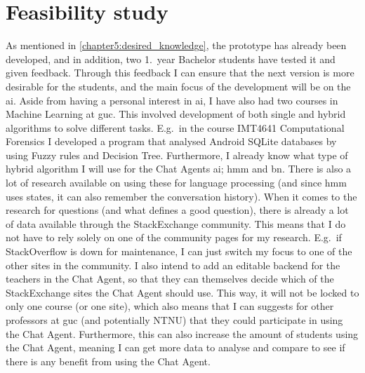 \chapter{Feasibility study}
\label{chapter6:feasibility_study}
As mentioned in \ref{chapter5:desired_knowledge}, the prototype has already been developed, and in addition, two 1.~year Bachelor students have tested it and given feedback. 
Through this feedback I can ensure that the next version is more desirable for the students, and the main focus of the development will be on the \gls{ai}. Aside from 
having a personal interest in \gls{ai}, I have also had two courses in Machine Learning at \gls{guc}. This involved development of both single and hybrid algorithms to 
solve different tasks. E.g.~in the course IMT4641 Computational Forensics I developed a program that analysed Android SQLite databases by using Fuzzy rules and Decision Tree.
Furthermore, I already know what type of hybrid algorithm I will use for the Chat Agents \gls{ai}; \gls{hmm} and \gls{bn}. There is also a lot of research available on 
using these for language processing (and since \gls{hmm} uses states, it can also remember the conversation history).
\vspace{0.5em}\newline
When it comes to the research for questions (and what defines a good question), there is already a lot of data available through the StackExchange community. This means that 
I do not have to rely solely on one of the community pages for my research. E.g.~if StackOverflow is down for maintenance, I can just switch my focus to one of the other 
sites in the community. I also intend to add an editable backend for the teachers in the Chat Agent, so that they can themselves decide which of the StackExchange sites the 
Chat Agent should use. This way, it will not be locked to only one course (or one site), which also means that I can suggests for other professors at \gls{guc} (and potentially 
NTNU) that they could participate in using the Chat Agent. Furthermore, this can also increase the amount of students using the Chat Agent, meaning I can get more data to 
analyse and compare to see if there is any benefit from using the Chat Agent.

\begin{comment}
1/2-3 pages

Why can this project be completed in time?  \\
Resource feasibility \\
- Technical resources \\
- Skills and competencies relevant in solving the problem  \\
- Resources for generating data to be analysed  \\
Schedule feasibility \\
- Size and complexity of tasks, deliverables, and milestones \\
- Headroom for the unexpected \\ \\

E.g. project in Adv. proj. work, comparison to other projects, attempt to answer research question, etc. \\
How to solve the issues/problems in the project
\end{comment}